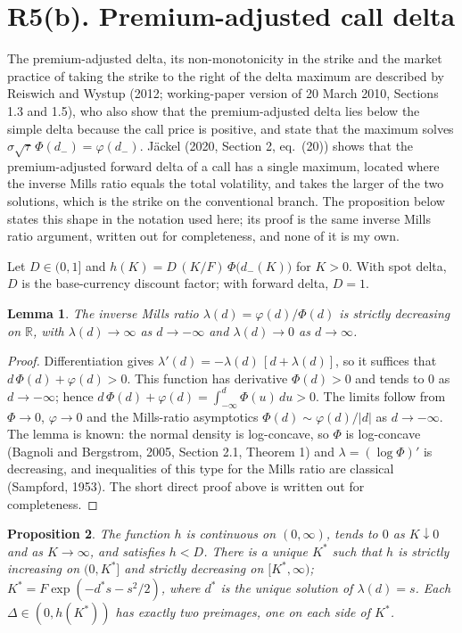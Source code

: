 \documentclass[11pt]{article}
\newtheorem{proposition}{Proposition}
\newtheorem{lemma}[proposition]{Lemma}
\theoremstyle{remark}
\begin{document}
\section*{R5(b). Premium-adjusted call delta}

The premium-adjusted delta, its non-monotonicity in the strike and the market practice of taking the strike to the right of the delta maximum are described by Reiswich and Wystup (2012; working-paper version of 20 March 2010, Sections 1.3 and 1.5), who also show that the premium-adjusted delta lies below the simple delta because the call price is positive, and state that the maximum solves $\sigma\sqrt\tau\,\Phi(d_-)=\varphi(d_-)$. J\"ackel (2020, Section 2, eq.~(20)) shows that the premium-adjusted forward delta of a call has a single maximum, located where the inverse Mills ratio equals the total volatility, and takes the larger of the two solutions, which is the strike on the conventional branch. The proposition below states this shape in the notation used here; its proof is the same inverse Mills ratio argument, written out for completeness, and none of it is my own.

Let $D\in(0,1]$ and $h(K)=D\,(K/F)\,\Phi\bigl(d_-(K)\bigr)$ for $K>0$. With spot delta, $D$ is the base-currency discount factor; with forward delta, $D=1$.

\begin{lemma}
The inverse Mills ratio $\lambda(d)=\varphi(d)/\Phi(d)$ is strictly decreasing on $\mathbb{R}$, with $\lambda(d)\to\infty$ as $d\to-\infty$ and $\lambda(d)\to0$ as $d\to\infty$.
\end{lemma}

\begin{proof}
Differentiation gives $\lambda'(d)=-\lambda(d)\,[d+\lambda(d)]$, so it suffices that $d\,\Phi(d)+\varphi(d)>0$. This function has derivative $\Phi(d)>0$ and tends to $0$ as $d\to-\infty$; hence $d\,\Phi(d)+\varphi(d)=\int_{-\infty}^d\Phi(u)\,du>0$. The limits follow from $\Phi\to0$, $\varphi\to0$ and the Mills-ratio asymptotics $\Phi(d)\sim\varphi(d)/|d|$ as $d\to-\infty$. The lemma is known: the normal density is log-concave, so $\Phi$ is log-concave (Bagnoli and Bergstrom, 2005, Section 2.1, Theorem 1) and $\lambda=(\log\Phi)'$ is decreasing, and inequalities of this type for the Mills ratio are classical (Sampford, 1953). The short direct proof above is written out for completeness.
\end{proof}

\begin{proposition}
The function $h$ is continuous on $(0,\infty)$, tends to $0$ as $K\downarrow0$ and as $K\to\infty$, and satisfies $h<D$. There is a unique $K^*$ such that $h$ is strictly increasing on $(0,K^*]$ and strictly decreasing on $[K^*,\infty)$; $K^*=F\exp(-d^*s-s^2/2)$, where $d^*$ is the unique solution of $\lambda(d)=s$. Each $\Delta\in(0,h(K^*))$ has exactly two preimages, one on each side of $K^*$.
\end{proposition}
\end{document}
